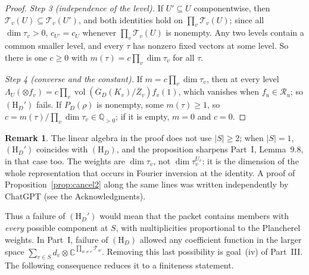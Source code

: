 \documentclass[12pt]{article}
\newcommand{\ov}[1]{\overline{#1}}
\newcommand{\C}{\mathbb{C}}
\newcommand{\vol}{\operatorname{vol}}
\newcommand{\Zb}{\ov{Z}}
\newcommand{\GDb}{\ov{G}_D}
\theoremstyle{plain}
\theoremstyle{definition}
\newtheorem{remark}[theorem]{Remark}
\begin{document}
\begin{proof}
\emph{Step 3 (independence of the level).} If $U'\subseteq U$ componentwise, then $\mathcal T_v(U)\subseteq\mathcal T_v(U')$, and both identities hold on $\prod_v\mathcal T_v(U)$; since all $\dim\tau_v>0$, $c_{U'}=c_U$ whenever $\prod_v\mathcal T_v(U)$ is nonempty. Any two levels contain a common smaller level, and every $\tau$ has nonzero fixed vectors at some level. So there is one $c\ge0$ with $m(\tau)=c\prod_v\dim\tau_v$ for all $\tau$.

\emph{Step 4 (converse and the constant).} If $m=c\prod_v\dim\tau_v$, then at every level $\Lambda_U(\otimes f_v)=c\prod_v\vol(\GDb(K_v)/\Zb_v)f_v(1)$, which vanishes when $f_u\in\mathcal R_u$; so $(\mathrm H_D')$ fails. If $P_D(\rho)$ is nonempty, some $m(\tau)\ge1$, so $c=m(\tau)/\prod_v\dim\tau_v\in\mathbb Q_{>0}$; if it is empty, $m=0$ and $c=0$.
\end{proof}

\begin{remark}
The linear algebra in the proof does not use $|S|\ge2$; when $|S|=1$, $(\mathrm H_D')$ coincides with $(\mathrm H_D)$, and the proposition sharpens Part~I, Lemma~9.8, in that case too. The weights are $\dim\tau_v$, not $\dim\tau_v^{U_v}$: it is the dimension of the whole representation that occurs in Fourier inversion at the identity. A proof of Proposition~\ref{prop:cancel2} along the same lines was written independently by ChatGPT (see the Acknowledgments).
\end{remark}

Thus a failure of $(\mathrm H_D')$ would mean that the packet contains members with \emph{every} possible component at $S$, with multiplicities proportional to the Plancherel weights. In Part~I, failure of $(\mathrm H_D)$ allowed any coefficient function in the larger space $\sum_{v\in S}d_v\otimes\C^{\prod_{w\ne v}\mathcal T_w}$. Removing this last possibility is goal~(iv) of Part~III. The following consequence reduces it to a finiteness statement.
\end{document}
